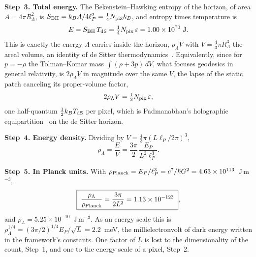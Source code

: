 \documentclass[aps,prd,twocolumn,superscriptaddress,nofootinbib,showkeys]{revtex4-2}
\begin{document}
\textbf{Step~3. Total energy.} The Bekenstein--Hawking entropy of the horizon, of area $A = 4\pi R_\Lambda^2$, is $S_{\rm BH} = k_BA/4\ell_P^2 = \tfrac14 N_{\rm pix}k_B$, and entropy times temperature is
\begin{equation}
E = S_{\rm BH}\,T_{\rm dS} = \tfrac14 N_{\rm pix}\,\varepsilon = 1.00\times10^{70}~{\rm J}.
\label{eq:ETS}
\end{equation}
This is exactly the energy $\Lambda$ carries inside the horizon, $\rho_\Lambda V$ with $V = \tfrac43\pi R_\Lambda^3$ the areal volume, an identity of de Sitter thermodynamics~\cite{padmanabhan2002}. Equivalently, since for $p=-\rho$ the Tolman--Komar mass $\int(\rho+3p)\,dV$, what focuses geodesics in general relativity, is $2\rho_\Lambda V$ in magnitude over the same $V$, the lapse of the static patch canceling its proper-volume factor,
\begin{equation}
2\rho_\Lambda V = \tfrac12 N_{\rm pix}\,\varepsilon,
\label{eq:equip}
\end{equation}
one half-quantum $\tfrac12 k_BT_{\rm dS}$ per pixel, which is Padmanabhan's holographic equipartition~\cite{padmanabhan2010,padmanabhan2012,padmanabhan2014} on the de Sitter horizon.

\textbf{Step~4. Energy density.} Dividing by $V = \tfrac43\pi(L\ell_P/2\pi)^3$,
\begin{equation}
\rho_\Lambda = \frac{E}{V} = \frac{3\pi}{2}\,\frac{E_P}{L^2\ell_P^3}.
\label{eq:rhoderived}
\end{equation}

\textbf{Step~5. In Planck units.} With $\rho_{\rm Planck} = E_P/\ell_P^3 = c^7/\hbar G^2 = 4.63\times10^{113}$~J\,m$^{-3}$,
\begin{equation}
\boxed{\;\frac{\rho_\Lambda}{\rho_{\rm Planck}} = \frac{3\pi}{2L^2} = 1.13\times10^{-123}\;},
\label{eq:suppression}
\end{equation}
and $\rho_\Lambda = 5.25\times10^{-10}$~J\,m$^{-3}$. As an energy scale this is $\rho_\Lambda^{1/4} = (3\pi/2)^{1/4}E_P/\sqrt{L} = 2.2$~meV, the millielectronvolt of dark energy written in the framework's constants. One factor of $L$ is lost to the dimensionality of the count, Step~1, and one to the energy scale of a pixel, Step~2.
\end{document}
